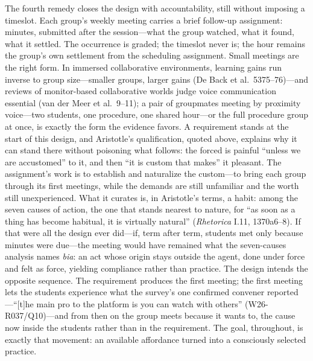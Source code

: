 The fourth remedy closes the design with accountability, still without
imposing a timeslot. Each group's weekly meeting carries a brief
follow-up assignment: minutes, submitted after the session---what the
group watched, what it found, what it settled. The occurrence is
graded; the timeslot never is; the hour remains the group's own
settlement from the scheduling assignment. Small meetings are the
right form. In immersed collaborative environments, learning gains run
inverse to group size---smaller groups, larger gains (De Back et al.\
5375--76)---and reviews of monitor-based collaborative worlds judge
voice communication essential (van der Meer et al.\ 9--11); a pair of
groupmates meeting by proximity voice---two students, one procedure,
one shared hour---or the full procedure group at once, is exactly the
form the evidence favors. A requirement stands at the start of this
design, and Aristotle's qualification, quoted above, explains why it
can stand there without poisoning what follows: the forced is painful
``unless we are accustomed'' to it, and then ``it is custom that
makes'' it pleasant. The assignment's work is to establish and naturalize the custom---to
bring each group through its first meetings, while the demands are
still unfamiliar and the worth still unexperienced. What it curates
is, in Aristotle's terms, a habit: among the seven causes of action,
the one that stands nearest to nature, for ``as soon as a thing has
become habitual, it is virtually natural'' (\textit{Rhetorica} I.11,
1370a6--8). If that were all
the design ever did---if, term after term, students met only because
minutes were due---the meeting would have remained what the
seven-causes analysis names \textit{bia}: an act whose origin stays
outside the agent, done under force and felt as force, yielding
compliance rather than practice. The design intends the opposite
sequence. The requirement produces the first meeting; the first
meeting lets the students experience what the survey's one confirmed
convener reported---``[t]he main pro to the platform is you can watch
with others'' (W26-R037/Q10)---and from then on the group meets
because it wants to, the cause now inside the students rather than in
the requirement. The goal, throughout, is exactly that movement: an
available affordance turned into a consciously selected practice.

